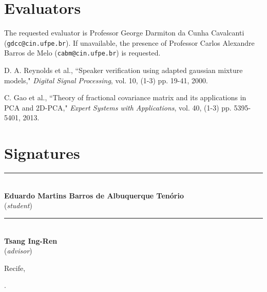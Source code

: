 \documentclass[a4paper,twocolumn]{article}
\begin{document}
\section{Evaluators}
\label{sec:eval}

The requested evaluator is Professor George Darmiton  da  Cunha  Cavalcanti (\texttt{gdcc@cin.ufpe.br}). If unavailable, the presence of Professor Carlos Alexandre Barros de Melo (\texttt{cabm@cin.ufpe.br}) is requested.


\begin{thebibliography}{9}
        D. A. Reynolds et al.,
        ``Speaker verification using adapted gaussian mixture models,"
        \textit{Digital Signal Processing}, vol. 10,
        (1-3) pp. 19-41,
        2000.

        C. Gao et al.,
        ``Theory of fractional covariance matrix and its applications in PCA and 2D-PCA,"
        \textit{Expert Systems with Applications}, vol. 40,
        (1-3) pp. 5395-5401,
        2013.
\end{thebibliography}

\newpage

\section*{Signatures}

\begin{center}
\vspace{3cm}

\rule{0.5\textwidth}{.4pt}\\
\textbf{Eduardo Martins Barros de Albuquerque Tenório}\\
(\textit{student})

\vspace{3cm}

\rule{0.5\textwidth}{.4pt}\\
\textbf{Tsang Ing-Ren}\\
(\textit{advisor})
\end{center}

\noindent Recife, \date{\today}.
\end{document}
